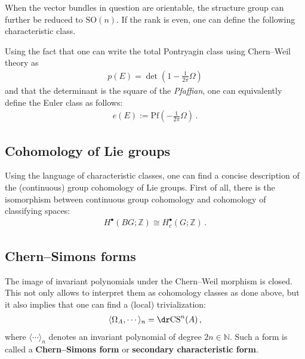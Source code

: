     When the vector bundles in question are orientable, the structure group can further be reduced to $\mathrm{SO}(n)$. If the rank is even, one can define the following characteristic class.
    \begin{property}
        Using the fact that one can write the total Pontryagin class using Chern--Weil theory as
        \begin{gather}
            p(E) = \det\left(1-\frac{1}{2\pi}\Omega\right)
        \end{gather}
        and that the determinant is the square of the \textit{Pfaffian}, one can equivalently define the Euler class as follows:
        \begin{gather}
            e(E) := \mathrm{Pf}\left(-\frac{1}{2\pi}\Omega\right)\,.
        \end{gather}
    \end{property}

\subsection{Cohomology of Lie groups}

    Using the language of characteristic classes, one can find a concise description of the (continuous) group cohomology of Lie groups. First of all, there is the isomorphism between continuous group cohomology and cohomology of classifying spaces:
    \begin{gather}
        H^\bullet(BG;\mathbb{Z})\cong H^\bullet_c(G;\mathbb{Z})\,.
    \end{gather}


\subsection{Chern--Simons forms}\label{section:chern_simons}

    The image of invariant polynomials under the Chern--Weil morphism is closed. This not only allows to interpret them as cohomology classes as done above, but it also implies that one can find a (local) trivialization:
    \begin{gather}
        \langle\Omega_A,\cdots\rangle_n = \dr\mathrm{CS}^n(A)\,,
    \end{gather}
    where $\langle\cdots\rangle_n$ denotes an invariant polynomial of degree $2n\in\mathbb{N}$. Such a form is called a \textbf{Chern--Simons form} or \textbf{secondary characteristic form}.

